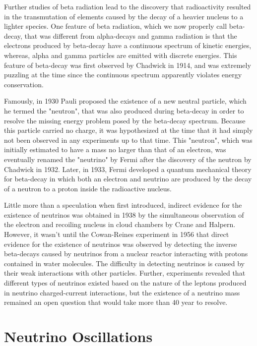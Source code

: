 Further studies of beta radiation lead to the discovery that radioactivity resulted in the transmutation of elements caused by the decay of a heavier nucleus to a lighter species. One feature of beta radiation, which we now properly call beta-decay, that was different from alpha-decays and gamma radiation is that the electrons produced by beta-decay have a continuous spectrum of kinetic energies, whereas, alpha and gamma particles are emitted with discrete energies. This feature of beta-decay was first observed by Chadwick in 1914, and was extremely puzzling at the time since the continuous spectrum apparently violates energy conservation. 

Famously, in 1930 Pauli proposed the existence of a new neutral particle, which he termed the "neutron", that was also produced during beta-decay in order to resolve the missing energy problem posed by the beta-decay spectrum. Because this particle carried no charge, it was hypothesized at the time that it had simply not been observed in any experiments up to that time. This "neutron", which was initially estimated to have a mass no larger than that of an electron, was eventually renamed the "neutrino" by Fermi after the discovery of the neutron by Chadwick in 1932. Later, in 1933, Fermi developed a quantum mechanical theory for beta-decay in which both an electron and neutrino are produced by the decay of a neutron to a proton inside the radioactive nucleus.

Little more than a speculation when first introduced, indirect evidence for the existence of neutrinos was obtained in 1938 by the simultaneous observation of the electron and recoiling nucleus in cloud chambers by Crane and Halpern. However, it wasn't until the Cowan-Reines experiment in 1956 that direct evidence for the existence of neutrinos was observed by detecting the inverse beta-decays caused by neutrinos from a nuclear reactor interacting with protons contained in water molecules. The difficulty in detecting neutrinos is caused by their weak interactions with other particles. Further, experiments revealed that different types of neutrinos existed based on the nature of the leptons produced in neutrino charged-current interactions, but the existence of a neutrino mass remained an open question that would take more than 40 year to resolve.

\section{Neutrino Oscillations}
\label{sec:chap2-nu-oscillation}

